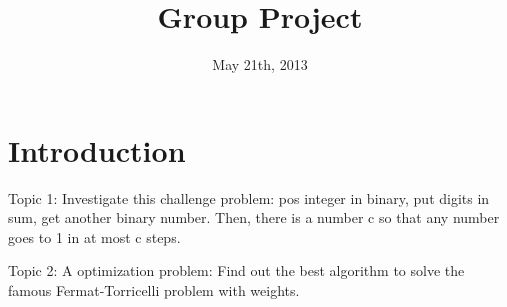 \documentclass{article}
\title{\textbf{Group Project}}
\date{May 21th, 2013}
\begin{document}
\maketitle %
\section{Introduction}

     Topic 1: Investigate this challenge problem: 
     pos integer in binary, put digits in sum, get another binary number. 
     Then, there is a number c so that any number goes to 1 in at most c steps.
     
     
     Topic 2: A optimization problem: Find out the best algorithm to solve the famous Fermat-Torricelli problem with weights. 

   
\end{document}
